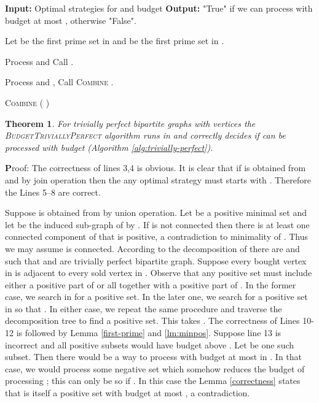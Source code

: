 \documentclass[letterpaper,11pt,abstracton]{scrartcl}
\newcommand{\pf}{{\textbf Proof: }}
\newtheorem{tm}[theorem]{Theorem}
\begin{document}
\begin{algorithm}[H]
\begin{algorithmic}[1]
\State \textbf{Input:} Optimal strategies for  and budget \;
\State \textbf{Output:} "True" if we can process  with budget at most , otherwise "False".\;

\State Let  be the first prime set in  and  be the first prime set in .

	\State Process  and 
       \State Call .


\Else{}  \State Process  and ,
         \State Call \textsc{Combine} .

\EndIf

\end{algorithmic}
\caption{{\textsc{Combine}} ( )}
\label{combine}
\end{algorithm}

\begin{tm}\label{thm:poly-TP-CB}
  For trivially perfect bipartite graphs  with  vertices the \textsc{BudgetTriviallyPerfect} algorithm runs in
   and correctly decides if  can be processed with budget  (Algorithm \ref{alg:trivially-perfect}).
\end{tm}
\pf The correctness of lines 3,4 is obvious. It is clear that if  is obtained from  and  by join operation then 
the any optimal strategy must starts with .
Therefore the Lines 5--8 are correct.

Suppose  is obtained from  by union operation. Let  be a positive minimal set and let  be the induced sub-graph
of  by . If  is not connected then there is at least one connected component of 
that is positive, a contradiction to minimality of . Thus we may assume  is connected. According to the decomposition of  there are
 and  such that  and  are trivially perfect bipartite graph.
Suppose every bought vertex in  is adjacent to every sold vertex in .
 Observe that  any positive set must include either a positive part of  or all  together with a positive part of .
In the former case, we search in  for a positive set. In the later one, we search for a positive set  in 
so that . In either case, we repeat the same procedure and
traverse the decomposition tree to find a positive set. This takes . The correctness of Lines 10-12 is followed by Lemma 
\ref{first-prime} and \ref{lm:minpos}. 
Suppose line 13 is incorrect and all positive subsets would have budget above .
Let  be one such subset. Then there would be a
way to process  with budget at most  in . In that case, we would process some negative set
 which somehow reduces the budget of processing ; this can
only be so if . In this case the Lemma
\ref{correctness} states that 
is itself a positive set with budget at most , a contradiction.\\
\end{document}
